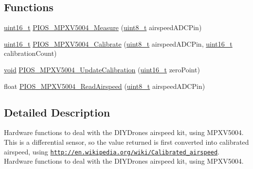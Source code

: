 \subsection*{Functions}
\begin{DoxyCompactItemize}
\item 
\hyperlink{stdint_8h_a273cf69d639a59973b6019625df33e30}{uint16\-\_\-t} \hyperlink{group___p_i_o_s___m_p_x_v5004_ga9d1a16484451fe9fa859327b682d1765}{P\-I\-O\-S\-\_\-\-M\-P\-X\-V5004\-\_\-\-Measure} (\hyperlink{stdint_8h_aba7bc1797add20fe3efdf37ced1182c5}{uint8\-\_\-t} airspeed\-A\-D\-C\-Pin)
\item 
\hyperlink{stdint_8h_a273cf69d639a59973b6019625df33e30}{uint16\-\_\-t} \hyperlink{group___p_i_o_s___m_p_x_v5004_ga19180270b31548797abd9fa9ab186ea8}{P\-I\-O\-S\-\_\-\-M\-P\-X\-V5004\-\_\-\-Calibrate} (\hyperlink{stdint_8h_aba7bc1797add20fe3efdf37ced1182c5}{uint8\-\_\-t} airspeed\-A\-D\-C\-Pin, \hyperlink{stdint_8h_a273cf69d639a59973b6019625df33e30}{uint16\-\_\-t} calibration\-Count)
\item 
\hyperlink{group___n_a_m_e_ga18028b8badbf1ea7e704ccac3c488e82}{void} \hyperlink{group___p_i_o_s___m_p_x_v5004_gabee93eb3cfa3b209d265726ca2619e67}{P\-I\-O\-S\-\_\-\-M\-P\-X\-V5004\-\_\-\-Update\-Calibration} (\hyperlink{stdint_8h_a273cf69d639a59973b6019625df33e30}{uint16\-\_\-t} zero\-Point)
\item 
float \hyperlink{group___p_i_o_s___m_p_x_v5004_ga04bd08ddc5bad453125a67cdde7446a5}{P\-I\-O\-S\-\_\-\-M\-P\-X\-V5004\-\_\-\-Read\-Airspeed} (\hyperlink{stdint_8h_aba7bc1797add20fe3efdf37ced1182c5}{uint8\-\_\-t} airspeed\-A\-D\-C\-Pin)
\end{DoxyCompactItemize}


\subsection{Detailed Description}
Hardware functions to deal with the D\-I\-Y\-Drones airspeed kit, using M\-P\-X\-V5004. This is a differential sensor, so the value returned is first converted into calibrated airspeed, using \href{http://en.wikipedia.org/wiki/Calibrated_airspeed}{\tt http\-://en.\-wikipedia.\-org/wiki/\-Calibrated\-\_\-airspeed}. Hardware functions to deal with the D\-I\-Y\-Drones airspeed kit, using M\-P\-X\-V5004.

